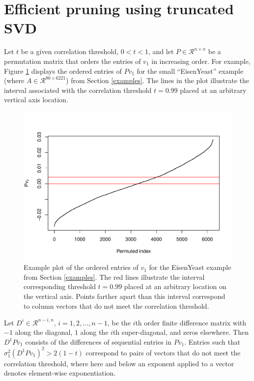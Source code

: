 \documentclass{article}
\numberwithin{algorithmctr}{section}
\begin{document}
\section{Efficient pruning using truncated SVD} \label{sect:algo}

Let $t$ be a given correlation threshold, $0<t<1$, and let
$P\in\mathcal{R}^{n\times n}$ be a permutation matrix that orders the entries
of $v_1$ in increasing order.  For example, Figure \ref{fig1} displays the
ordered entries of $Pv_1$ for the small ``EisenYeast'' example (where
$A\in\mathcal{R}^{80 \times 6221}$) from Section \ref{examples}.  The lines in
the plot illustrate the interval associated with the correlation threshold
$t=0.99$ placed at an arbitrary vertical axis location.

\begin{figure}[!ht]
\begin{center}
\includegraphics{draft-001}
\caption{
Example plot of the ordered entries of $v_1$ for the EisenYeast example from
Section \ref{examples}. The red lines illustrate the interval corresponding
threshold $t=0.99$ placed at an arbitrary location on the vertical axis. Points
farther apart than this interval correspond to column vectors that do not meet
the correlation threshold.
\label{fig1}
}
\end{center}
\end{figure}

Let $D^i\in\mathcal{R}^{n-i, n}$, $i=1,2,\ldots,n-1$, be the $i$th order finite
difference matrix with $-1$ along the diagonal, $1$ along the $i$th
super-diagonal, and zeros elsewhere.  Then $D^1P v_1$ consists of the
differences of sequential entries in $P v_1$.  Entries such that $\sigma_1^2 (D^1
P v_1)^2 > 2(1-t)$ correspond to pairs of vectors that do not meet the
correlation threshold, where here and below an exponent applied to a vector
denotes element-wise exponentiation.
\end{document}
